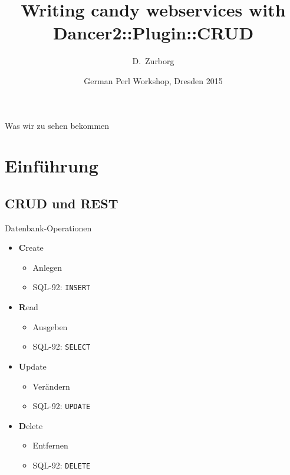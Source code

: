 \documentclass[aspectratio=1610]{beamer}
\title{Writing candy webservices with Dancer2::Plugin::CRUD}
\author{D.~Zurborg}
\institute[PPIT] %
{
    ProPartner.IT GmbH\\
    Osnabrück
}
\date[GPW 2015]{German Perl Workshop, Dresden 2015}
\begin{document}

\begin{frame}
  \titlepage
\end{frame}


\begin{frame}{Was wir zu sehen bekommen}
    \tableofcontents
\end{frame}


\section{Einführung}


\subsection{CRUD und REST}


\begin{frame}{Datenbank-Operationen}
    \begin{itemize}
    \item
        \textbf{C}reate
        \pause
        \begin{itemize}
            \item Anlegen
            \pause
            \item SQL-92: \texttt{INSERT}
        \end{itemize}
    \pause
    \item
        \textbf{R}ead
        \pause
        \begin{itemize}
            \item Ausgeben
            \pause
            \item SQL-92: \texttt{SELECT}
        \end{itemize}
    \pause
    \item
        \textbf{U}pdate
        \pause
        \begin{itemize}
            \item Verändern
            \pause
            \item SQL-92: \texttt{UPDATE}
        \end{itemize}
    \pause
    \item
        \textbf{D}elete
        \pause
        \begin{itemize}
            \item Entfernen
            \pause
            \item SQL-92: \texttt{DELETE}
        \end{itemize}
    \end{itemize}
\end{frame}
\end{document}
